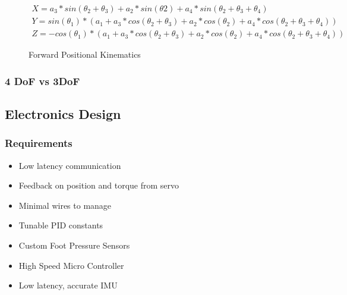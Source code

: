     \begin{figure}[H]
    \centering
    \begin{gather*}
    X = a_3*sin(\theta_2+\theta_3)+a_2*sin(\theta2)+a_4*sin(\theta_2+\theta_3+\theta_4)\\
    Y = sin(\theta_1)*(a_1+a_3*cos(\theta_2+\theta_3)+a_2*cos(\theta_2)+a_4*cos(\theta_2+\theta_3+\theta_4))\\
    Z = -cos(\theta_1)*(a_1+a_3*cos(\theta_2+\theta_3)+a_2*cos(\theta_2)+a_4*cos(\theta_2+\theta_3+\theta_4))
    \end{gather*}
    
    \caption{Forward Positional Kinematics}
    \label{fig:FWKin_Robot}
    \end{figure}
    

      
    


     \subsubsection{4 DoF vs 3DoF}

\subsection{Electronics Design}

    \subsubsection{Requirements}
        \begin{itemize} %
            \item Low latency communication
            \item Feedback on position and torque from servo
            \item Minimal wires to manage
            \item Tunable PID constants
            \item Custom Foot Pressure Sensors
            \item High Speed Micro Controller
            \item Low latency, accurate IMU
        \end{itemize}
